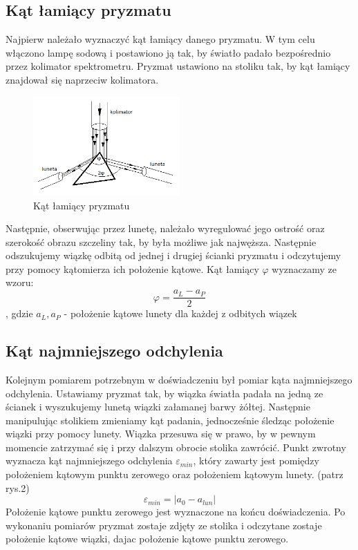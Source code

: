\documentclass[a4paper,10pt]{article}
\begin{document}
\subsection{Kąt łamiący pryzmatu}
Najpierw należało wyznaczyć kąt łamiący danego pryzmatu. W tym celu włączono lampę sodową i postawiono ją tak, by światło padało bezpośrednio przez kolimator spektrometru. Pryzmat ustawiono na stoliku tak, by kąt łamiący znajdował się naprzeciw kolimatora. 
\begin{figure} [H]
  \centering
  \includegraphics[width=0.5\textwidth]{./phi.png}
  \caption{Kąt łamiący pryzmatu}
  \label{}
\end{figure}
Następnie, obserwując %
przez lunetę, należało wyregulować jego ostrość oraz szerokość obrazu szczeliny tak, by była możliwe jak najwęższa. Następnie odszukujemy wiązkę odbitą od jednej i drugiej ścianki pryzmatu i odczytujemy przy pomocy kątomierza ich położenie kątowe. Kąt łamiący $\varphi$ wyznaczamy ze wzoru:
\begin{equation}
\varphi = \frac{a_L - a_P}{2}
\end{equation}
, gdzie $a_L, a_P$ - położenie kątowe lunety dla każdej z odbitych wiązek

\subsection{Kąt najmniejszego odchylenia}
Kolejnym pomiarem potrzebnym w doświadczeniu był pomiar kąta najmniejszego odchylenia. Ustawiamy pryzmat tak, by wiązka światła padała na jedną ze ścianek i wyszukujemy lunetą wiązki załamanej barwy żółtej. Następnie manipulując stolikiem zmieniamy kąt padania, jednocześnie śledząc położenie wiązki przy pomocy lunety. Wiązka przesuwa się w prawo, by w pewnym momencie zatrzymać się i przy dalszym obrocie stolika zawrócić. Punkt zwrotny wyznacza kąt najmniejszego odchylenia $\varepsilon_{min}$, który zawarty jest pomiędzy położeniem kątowym punktu zerowego oraz położeniem kątowym lunety. (patrz rys.2)
\begin{equation}
\varepsilon_{min} = |a_0 - a_{lun}|
\end{equation}
Położenie kątowe punktu zerowego jest wyznaczone na końcu doświadczenia. Po wykonaniu pomiarów pryzmat zostaje zdjęty ze stolika i odczytane zostaje położenie kątowe wiązki, dajac położenie kątowe punktu zerowego.
\end{document}
